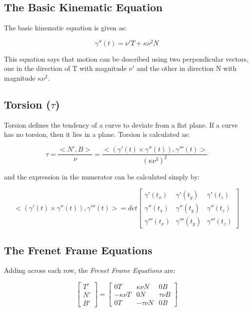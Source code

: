 \documentclass{article}
\begin{document}
 \subsection{The Basic Kinematic Equation}
 
 The basic kinematic equation is given as:
 
 \[ \gamma''(t)  = \nu'T + \kappa \nu^2 N\]
 
 This equation says that motion can be described using two perpendicular vectors, one in the direction of T with magnitude $\nu'$ and the other in direction N with magnitude $\kappa \nu^2$.
 
 \subsection{Torsion ($\tau$)}
 
 Torsion defines the tendency of a curve to deviate from a flat plane. If a curve has no torsion, then it lies in a plane. Torsion is calculated as:
 
  \[ \tau = \frac{<N',B>}{\nu}  = \frac{<(\gamma'(t) \times \gamma''(t)), \gamma'''(t)>}{(\kappa \nu^3)^2}\]
  
  and the expression in the numerator can be calculated simply by:
  
  \[
  <(\gamma'(t) \times \gamma''(t)), \gamma'''(t)> =
  det
  \begin{bmatrix}
\gamma'(t_{x}) & \gamma'(t_{y}) & \gamma'(t_{z})\\
\gamma''(t_{x}) & \gamma''(t_{y}) & \gamma''(t_{z})\\
 \gamma'''(t_{x}) & \gamma'''(t_{y}) & \gamma'''(t_{z})
\end{bmatrix}
 \]
 
 \subsection{The Frenet Frame Equations}
 
 Adding across each row, the {\it{Frenet Frame Equations}} are:

\[ 
\begin{bmatrix}
T' \\
N' \\
B' 
\end{bmatrix}
=
\begin{bmatrix}
0T & \kappa \nu N & 0B\\
-\kappa \nu T & 0N & \tau \nu B\\
 0T& -\tau \nu N & 0B
\end{bmatrix}
 \]
 
\end{document}
